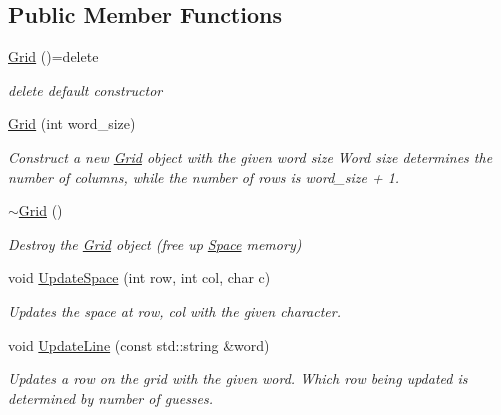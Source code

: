 \subsection*{Public Member Functions}
\begin{DoxyCompactItemize}
\item 
\mbox{\label{classgame_1_1objects_1_1Grid_adccb0e5dcc469737ee2ed80ee0a2f69c}} 
\hyperlink{classgame_1_1objects_1_1Grid_adccb0e5dcc469737ee2ed80ee0a2f69c}{Grid} ()=delete
\begin{DoxyCompactList}\small\item\em delete default constructor \end{DoxyCompactList}\item 
\hyperlink{classgame_1_1objects_1_1Grid_a8ccdcfad249ef402977c9a9582ef02f7}{Grid} (int word\+\_\+size)
\begin{DoxyCompactList}\small\item\em Construct a new \hyperlink{classgame_1_1objects_1_1Grid}{Grid} object with the given word size Word size determines the number of columns, while the number of rows is word\+\_\+size + 1. \end{DoxyCompactList}\item 
\mbox{\label{classgame_1_1objects_1_1Grid_a631c3b3217e25366b41746c3507c392f}} 
\hyperlink{classgame_1_1objects_1_1Grid_a631c3b3217e25366b41746c3507c392f}{$\sim$\+Grid} ()
\begin{DoxyCompactList}\small\item\em Destroy the \hyperlink{classgame_1_1objects_1_1Grid}{Grid} object (free up \hyperlink{classgame_1_1objects_1_1Space}{Space} memory) \end{DoxyCompactList}\item 
void \hyperlink{classgame_1_1objects_1_1Grid_ac1be0e2e0ae78559eb9581f6ea21da57}{Update\+Space} (int row, int col, char c)
\begin{DoxyCompactList}\small\item\em Updates the space at row, col with the given character. \end{DoxyCompactList}\item 
void \hyperlink{classgame_1_1objects_1_1Grid_a4ac6a9c2fcd4fac310ff3ebbe02eb56d}{Update\+Line} (const std\+::string \&word)
\begin{DoxyCompactList}\small\item\em Updates a row on the grid with the given word. Which row being updated is determined by number of guesses. \end{DoxyCompactList}\item 

\end{DoxyCompactItemize}

